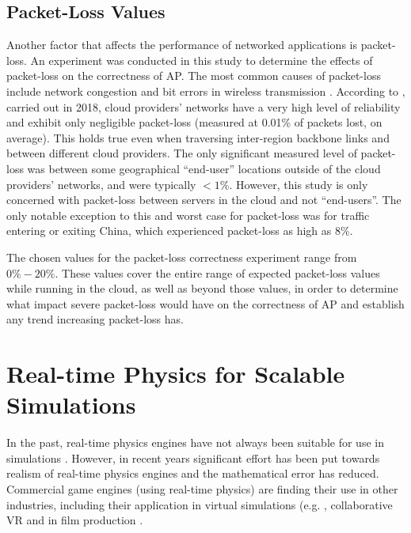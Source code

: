 \subsection{Packet-Loss Values}
Another factor that affects the performance of networked applications is packet-loss. An experiment was conducted in this study to determine the effects of packet-loss on the correctness of AP. The most common causes of packet-loss include network congestion \cite{1998PacketLoss} and bit errors in wireless transmission \cite{2005PacketLoss}. According to \cite{ThousandEyesCloudPerf2018}, carried out in 2018, cloud providers' networks have a very high level of reliability and exhibit only negligible packet-loss (measured at 0.01\% of packets lost, on average). This holds true even when traversing inter-region backbone links and between different cloud providers. The only significant measured level of packet-loss was between some geographical ``end-user'' locations outside of the cloud providers' networks, and were typically $<1\%$. However, this study is only concerned with packet-loss between servers in the cloud and not ``end-users''. The only notable exception to this and worst case for packet-loss was for traffic entering or exiting China, which experienced packet-loss as high as $8\%$.

The chosen values for the packet-loss correctness experiment range from $0\%-20\%$. These values cover the entire range of expected packet-loss values while running in the cloud, as well as beyond those values, in order to determine what impact severe packet-loss would have on the correctness of AP and establish any trend increasing packet-loss has.

\section{Real-time Physics for Scalable Simulations}

In the past, real-time physics engines have not always been suitable for use in simulations \cite{Boeing2007}. However, in recent years significant effort has been put towards realism of real-time physics engines and the mathematical error has reduced. Commercial game engines (using real-time physics) are finding their use in other industries, including their application in virtual simulations (e.g. \cite{Xu2017, Lu2017, Shah2018}, collaborative VR \cite{NVIDIAHolodeck} and in film production \cite{mehta2015animated}.

